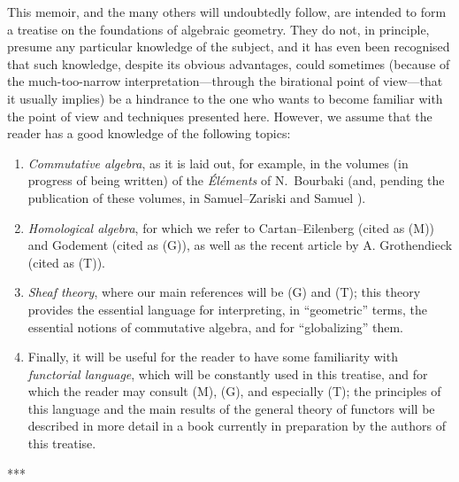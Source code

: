 \documentclass[openany,oneside]{amsbook}
\theoremstyle{ega-env-style}
\theoremstyle{ega-thm-env-style}
\theoremstyle{ega-defn-env-style}
\newcommand{\oldpage}[2][--]{{\marginpar{\textbf{#1}~|~#2}}\ignorespaces}
\def\sectionbreak{\begin{center}***\end{center}}
\begin{document}
\oldpage[I]{5}
This memoir, and the many others will undoubtedly follow, are intended to form a treatise on the foundations of algebraic geometry.
They do not, in principle, presume any particular knowledge of the subject, and it has even been recognised that such knowledge, despite its obvious advantages, could sometimes (because of the much-too-narrow interpretation---through the birational point of view---that it usually implies) be a hindrance to the one who wants to become familiar with the point of view and techniques presented here.
However, we assume that the reader has a good knowledge of the following topics:
\begin{enumerate}[label=(\alph*)]
    \item \emph{Commutative algebra}, as it is laid out, for example, in the volumes (in progress of being written) of the \emph{\'El\'ements} of N.~Bourbaki (and, pending the publication of these volumes, in Samuel--Zariski \cite{I-13} and Samuel \cite{I-11,I-12}).
    \item \emph{Homological algebra}, for which we refer to Cartan--Eilenberg \cite{I-2} (cited as (M)) and Godement \cite{I-4} (cited as (G)), as well as the recent article by A. Grothendieck \cite{I-6} (cited as (T)).
    \item \emph{Sheaf theory}, where our main references will be (G) and (T);
        this theory provides the essential language for interpreting, in ``geometric'' terms, the essential notions of commutative algebra, and for ``globalizing'' them.
    \item Finally, it will be useful for the reader to have some familiarity with \emph{functorial language}, which will be constantly used in this treatise, and for which the reader may consult (M), (G), and especially (T);
        the principles of this language and the main results of the general theory of functors will be described in more detail in a book currently in preparation by the authors of this treatise.
\end{enumerate}

\sectionbreak
\end{document}
